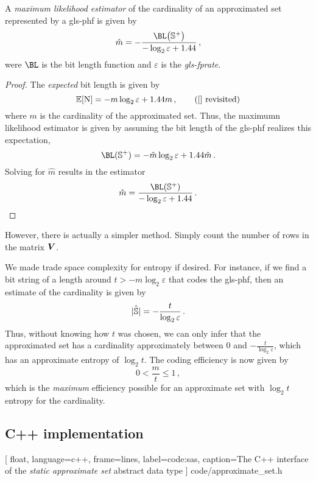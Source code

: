 \documentclass[ ../main.tex]{subfiles}
\begin{document}
\begin{theorem}
A \emph{maximum likelihood estimator} of the cardinality of an approximated set represented by a \gls{gls-phf} is given by
\begin{equation}
    \hat{m} = -\frac{\BL\!\left(\Sp\right)}{-\log_2 \varepsilon + 1.44}\,,
\end{equation}
were $\BL$ is the bit length function and $\varepsilon$ is the \emph{\gls{gls-fprate}}.
\end{theorem}
\begin{proof}
The \emph{expected} bit length is given by
\begin{equation*}
    \expectation[\rv{N}] = -m \log_2 \varepsilon + 1.44 m\,, 
    \tag{\ref{} revisited}
\end{equation*}
where $m$ is the cardinality of the approximated set. Thus, the maximumn likelihood estimator is given by assuming the bit length of the \gls{gls-phf} realizes this expectation,
\begin{equation}
    \BL(\Sp) = -\hat{m} \log_2 \varepsilon + 1.44 \hat{m}\,.
\end{equation}
Solving for $\hat{m}$ results in the estimator
\begin{equation}
    \hat{m} = \frac{\BL(\Sp)}{-\log_2 \varepsilon + 1.44}\,.
\end{equation}
\end{proof}
However, there is actually a simpler method. Simply count the number of rows in the matrix $\boldsymbol{V}$.

We made trade space complexity for entropy if desired. For instance, if we find a bit string of a length around $t > -m \log_2 \varepsilon$ that codes the \gls{gls-phf}, then an estimate of the cardinality is given by
\begin{equation}
    \hat{\left\vert{\mathbb{S}}\right\vert} = -\frac{t}{\log_2 \varepsilon}\,.
\end{equation}
Thus, without knowing how $t$ was chosen, we can only infer that the approximated set has a cardinality approximately between $0$ and $-\frac{t}{\log_2 \varepsilon}$, which has an approximate entropy of $\log_2 t$. The coding efficiency is now given by
\begin{equation}
    0 < \frac{m}{t} \leq 1\,,
\end{equation}
which is the \emph{maximum} efficiency possible for an approximate set with $\log_2 t$ entropy for the cardinality.

\subsection{C++ implementation}

[
    float,
    language=c++,
    frame=lines,
    label={code:sas},
    caption={The C++ interface of the \emph{static approximate set}} abstract data type
]
{code/approximate_set.h}
\end{document}
